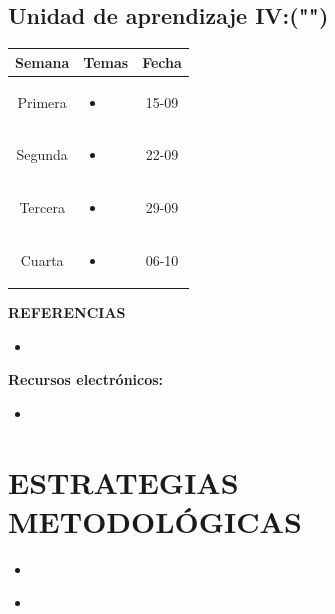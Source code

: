 \documentclass[a4paper]{article}
\begin{document}
\subsection{Unidad de aprendizaje IV:("")}
\begin{table}[ht]
\centering
\begin{tabular}{|c|c|c|}
\hline
\textbf{Semana} & \textbf{Temas} & \textbf{Fecha} \\ 
\hline
Primera 
& \begin{minipage}[t]{10cm}
\begin{itemize}
\item 
\end{itemize}
\end{minipage} & 15-09\\ 
\hline 
Segunda 
& \begin{minipage}[t]{10cm}
\begin{itemize}
\item 
\end{itemize}
\end{minipage} & 22-09\\ 
\hline 
Tercera 
& \begin{minipage}[t]{10cm}
\begin{itemize}
\item 
\end{itemize}
\end{minipage} & 29-09 \\ 
\hline 
Cuarta 
& \begin{minipage}[t]{10cm}
\begin{itemize}
\item 
\end{itemize}
\end{minipage} & 06-10 \\ 
\hline 
\end{tabular}
\end{table}
{\huge \bf REFERENCIAS}\\[0.3cm]
\begin{itemize}
\item 
\end{itemize}
{\huge \bf Recursos electrónicos:}\\[0.3cm]
\begin{itemize}
\item 
\end{itemize}
\section {ESTRATEGIAS METODOLÓGICAS}
\begin{itemize}
\item 
\end{itemize}
\begin{itemize}
\item 
\end{itemize}
\end{document}
